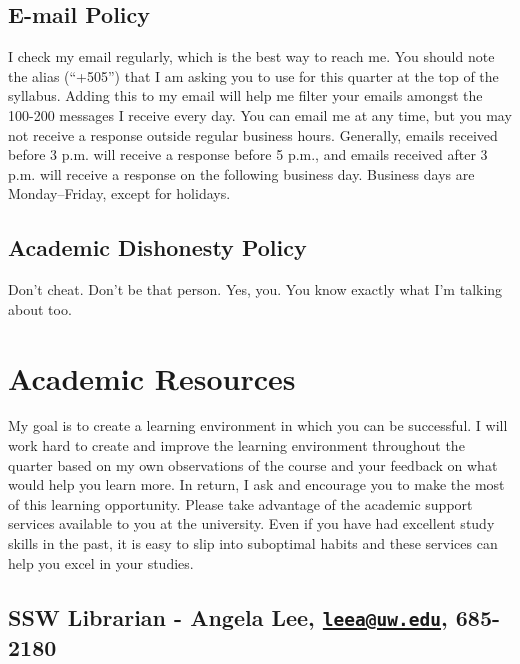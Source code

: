 \documentclass[11pt,]{article}
\begin{document}
\subsection{E-mail Policy}\label{e-mail-policy}

I check my email regularly, which is the best way to reach me. You
should note the alias (``+505'') that I am asking you to use for this
quarter at the top of the syllabus. Adding this to my email will help me
filter your emails amongst the 100-200 messages I receive every day. You
can email me at any time, but you may not receive a response outside
regular business hours. Generally, emails received before 3 p.m. will
receive a response before 5 p.m., and emails received after 3 p.m. will
receive a response on the following business day. Business days are
Monday--Friday, except for holidays.

\subsection{Academic Dishonesty
Policy}\label{academic-dishonesty-policy}

Don't cheat. Don't be that person. Yes, you. You know exactly what I'm
talking about too.

\section{Academic Resources}\label{academic-resources}

My goal is to create a learning environment in which you can be
successful. I will work hard to create and improve the learning
environment throughout the quarter based on my own observations of the
course and your feedback on what would help you learn more. In return, I
ask and encourage you to make the most of this learning opportunity.
Please take advantage of the academic support services available to you
at the university. Even if you have had excellent study skills in the
past, it is easy to slip into suboptimal habits and these services can
help you excel in your studies.

\subsection{\texorpdfstring{SSW Librarian - Angela Lee,
\href{mailto:leea@uw.edu}{\nolinkurl{leea@uw.edu}},
685-2180}{SSW Librarian - Angela Lee, leea@uw.edu, 685-2180}}\label{ssw-librarian---angela-lee-leeauw.edu-685-2180}
\end{document}
